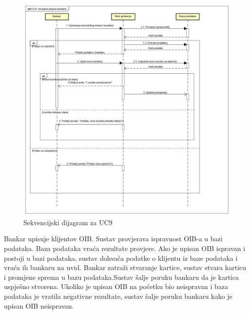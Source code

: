 				\begin{figure}[H]
					\includegraphics[scale=0.50]{slike/UC9.PNG}
					\centering
					\caption{Sekvencijski dijagram za UC9}
					\label{fig:uc9}
				\end{figure}
			\eject
			
			
			 Bankar upisuje klijentov OIB. Sustav provjerava ispravnost OIB-a u bazi podataka. Baza podataka vraća rezultate provjere. Ako je upisan OIB ispravan i postoji u bazi podataka, sustav dohvaća podatke o klijentu iz baze podataka i vraća ih bankaru na uvid. Bankar zatraži stvaranje kartice, sustav stvara karticu i promjene sprema u bazu podataka.Sustav šalje poruku bankaru da je kartica uspješno stvorena. Ukoliko je upisan OIB na početku bio neispravan i baza podataka je vratila negativne rezultate, sustav šalje poruku bankaru kako je upisan OIB neispravan.
			\eject
			

